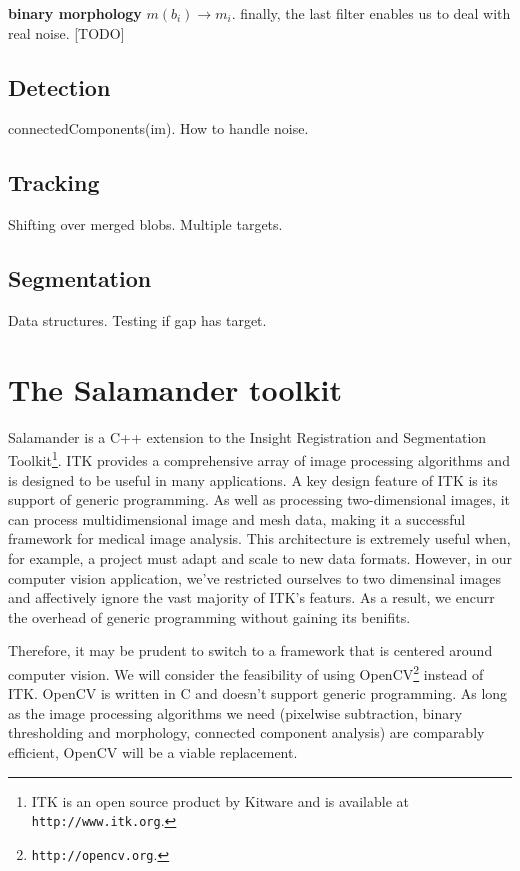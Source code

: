 \documentclass[letter]{article}
\newcounter{foot}
\begin{document}
 \textbf{binary morphology} $m(b_i) \rightarrow m_i$. finally, the last filter 
enables us to deal with real noise. [TODO] 

\subsection{Detection}
connectedComponents(im). How to handle noise. 

\subsection{Tracking}
Shifting over merged blobs. 
Multiple targets. 

\subsection{Segmentation}
Data structures. 
Testing if gap has target. 
 
\section{The Salamander toolkit}
Salamander is a C++ extension to the Insight Registration and Segmentation Toolkit\footnote
{ITK is an open source product by Kitware and is available at \texttt{http://www.itk.org}.}.
ITK provides a comprehensive array of image processing algorithms and is designed to 
be useful in many applications. A key design feature of ITK is its support of generic programming. 
As well as processing two-dimensional images, it can process multidimensional image and 
mesh data, making it a successful framework for medical image analysis. This architecture 
is extremely useful when, for example, a project must adapt and scale to new data formats. 
However, in our computer vision application, we've restricted ourselves to two dimensinal 
images and affectively ignore the vast majority of ITK's featurs. As a result, we encurr 
the overhead of generic programming without gaining its benifits. 

Therefore, it may be prudent to switch to a framework that is centered around computer 
vision. We will consider the feasibility of using OpenCV\footnote{\texttt{http://opencv.org}.} 
instead of ITK. OpenCV is written in C and doesn't support generic programming. As long
as the image processing algorithms we need (pixelwise subtraction, binary thresholding and
morphology, connected component analysis) are comparably efficient, OpenCV will be a 
viable replacement. 
\end{document}
